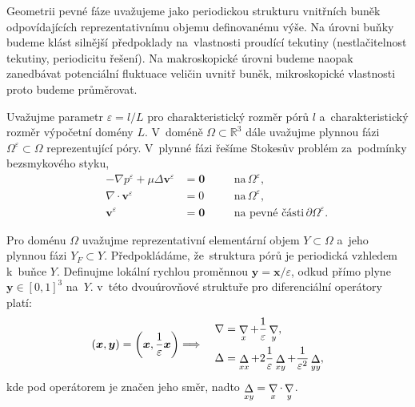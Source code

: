 Geometrii pevné fáze uvažujeme jako periodickou strukturu vnitřních buněk odpovídajících reprezentativnímu objemu definovanému výše. Na úrovni buňky budeme klást silnější předpoklady na~vlastnosti proudící tekutiny (nestlačitelnost tekutiny, periodicitu řešení). Na makroskopické úrovni budeme naopak zanedbávat potenciální fluktuace veličin uvnitř buněk, mikroskopické vlastnosti proto budeme průměrovat.

Uvažujme parametr $\varepsilon=l/L$ pro charakteristický rozměr pórů $l$ a~charakteristický rozměr výpočetní domény $L$. V~doméně $\Omega \subset \mathbb{R}^3$ dále uvažujme plynnou fázi $\Omega^\varepsilon\subset\Omega$ reprezentující póry. V~plynné fázi řešíme Stokesův problém za~podmínky bezsmykového styku,
\begin{subequations}\label{eq:permeability_stokes_formulation}
    \begin{align}
        \label{eq:permeability_stokes_formulation:innertia}
    &&-\nabla p^{\varepsilon}+\mu \Delta \bm{v}^{\varepsilon}&=\bm{0}
    \quad && \textrm{na}\,\Omega^\varepsilon,\\
        \label{eq:permeability_stokes_formulation:incrompressibility}
    &&\nabla\cdot\bm{v}^\varepsilon&=0
    \quad && \textrm{na}\,\Omega^\varepsilon,\\
    \label{eq:permeability_stokes_formulation:boundary}
    &&\bm{v}^\varepsilon&=\bm{0}
    \quad && \textrm{na pevné části}\,\partial\Omega^\varepsilon.
    \end{align}
\end{subequations}

Pro doménu $\Omega$ uvažujme reprezentativní elementární objem $Y\subset\Omega$ a~jeho plynnou fázi $Y_F\subset Y$. Předpokládáme, že~struktura pórů je periodická vzhledem k~buňce $Y$. Definujme lokální rychlou proměnnou $\bm{y}=\bm{x}/\varepsilon$, odkud přímo plyne $\bm{y}\in\left[0,1\right]^3$ na~$Y$. v~této dvouúrovňové struktuře pro diferenciální operátory platí:
\begin{equation}
    \left(\bm{x},\bm{y}\right)=\left(\bm{x},\frac{1}{\varepsilon}\bm{x}\right)
    \Longrightarrow\quad
    \begin{aligned}
    &\nabla=\mathop{\nabla}\limits_{x}+\frac{1}{\varepsilon}\mathop{\nabla}\limits_{y},\\
    &\Delta=\mathop{\Delta}\limits_{xx}+2\frac{1}{\varepsilon}\mathop{\Delta}\limits_{xy}+\frac{1}{\varepsilon^{2}}\mathop{\Delta}\limits_{yy},
    \end{aligned}
\end{equation}
kde pod operátorem je značen jeho směr, nadto $\mathop{\Delta}\limits_{xy}=\mathop{\nabla}\limits_{x}\cdot\mathop{\nabla}\limits_{y}$.

